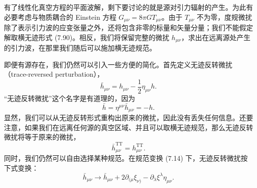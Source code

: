 有了线性化真空方程的平面波解，剩下要讨论的就是源对引力辐射的产生。为此有必要考虑与物质耦合的 Einstein 方程 $G_{\mu\nu} = 8\pi G T_{\mu\nu}$。由于 $T_{\mu\nu}$ 不为零，度规微扰除了表示引力波的应变张量之外，还将包含非零的标量和矢量分量；我们不能假定解取横无迹形式 (7.90)。相反，我们将保留完整的微扰 $h_{\mu\nu}$，求出在远离源处产生的引力波，在那里我们随后可以施加横无迹规范。

即便有源存在，我们仍然可以引入一些方便的简化。首先定义无迹反转微扰（trace-reversed perturbation），
\begin{equation*}
\bar{h}_{\mu\nu} = h_{\mu\nu} - \frac{1}{2}\eta_{\mu\nu}h.
\tag{7.117}
\end{equation*}
“无迹反转微扰”这个名字是有道理的，因为
\begin{equation*}
\bar{h} = \eta^{\mu\nu}\bar{h}_{\mu\nu} = -h.
\tag{7.118}
\end{equation*}
显然，我们可以从无迹反转形式重构出原来的微扰，因此没有丢失任何信息。还要注意，如果我们在远离任何源的真空区域、并且可以取横无迹规范，那么无迹反转微扰将等于原来的微扰，
\begin{equation*}
\bar{h}^{\mathrm{TT}}_{\mu\nu} = h^{\mathrm{TT}}_{\mu\nu}.
\tag{7.119}
\end{equation*}
同时，我们仍然可以自由选择某种规范。在规范变换 (7.14) 下，无迹反转微扰按下式变换：
\begin{equation*}
\bar{h}_{\mu\nu} \rightarrow \bar{h}_{\mu\nu} + 2\partial_{(\mu}\xi_{\nu)} - \partial_\lambda\xi^{\lambda}\eta_{\mu\nu}.
\tag{7.120}
\end{equation*}


